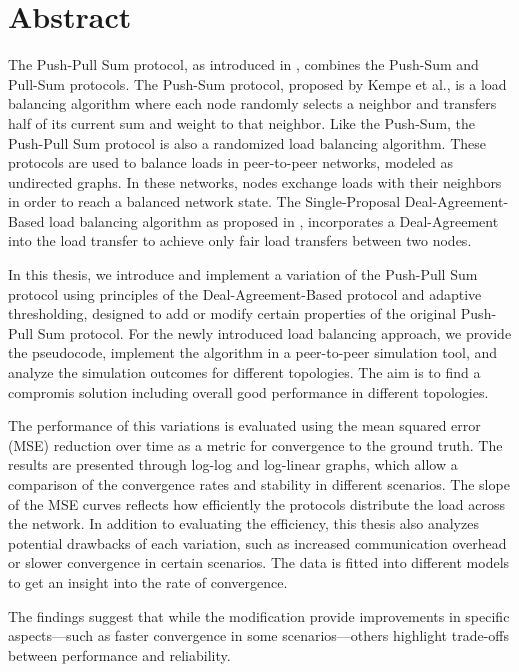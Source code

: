 \chapter*{Abstract}

The Push-Pull Sum protocol, as introduced in \cite{nugroho2023PushPullSumDataAg}, combines the Push-Sum \cite{kempe2003gossipbasedComp} and Pull-Sum protocols. The Push-Sum protocol, proposed by Kempe et al., is a load balancing algorithm where each node randomly selects a neighbor and transfers half of its current sum and weight to that neighbor. Like the Push-Sum, the Push-Pull Sum protocol is also a randomized load balancing algorithm. These protocols are used to balance loads in peer-to-peer networks, modeled as undirected graphs. In these networks, nodes exchange loads with their neighbors in order to reach a balanced network state. The Single-Proposal Deal-Agreement-Based load balancing algorithm as proposed in \cite{Dinitz2023DAB}, incorporates a Deal-Agreement into the load transfer to achieve only fair load transfers between two nodes.

In this thesis, we introduce and implement a variation of the Push-Pull Sum protocol using principles of the Deal-Agreement-Based protocol and adaptive thresholding, designed to add or modify certain properties of the original Push-Pull Sum protocol. For the newly introduced load balancing approach, we provide the pseudocode, implement the algorithm in a peer-to-peer simulation tool, and analyze the simulation outcomes for different topologies. The aim is to find a compromis solution including overall good performance in different topologies.

The performance of this variations is evaluated using the mean squared error (MSE) reduction over time as a metric for convergence to the ground truth. The results are presented through log-log and log-linear graphs, which allow a comparison of the convergence rates and stability in different scenarios. The slope of the MSE curves reflects how efficiently the protocols distribute the load across the network. In addition to evaluating the efficiency, this thesis also analyzes potential drawbacks of each variation, such as increased communication overhead or slower convergence in certain scenarios. The data is fitted into different models to get an insight into the rate of convergence.

The findings suggest that while the modification provide improvements in specific aspects—such as faster convergence in some scenarios—others highlight trade-offs between performance and reliability. 